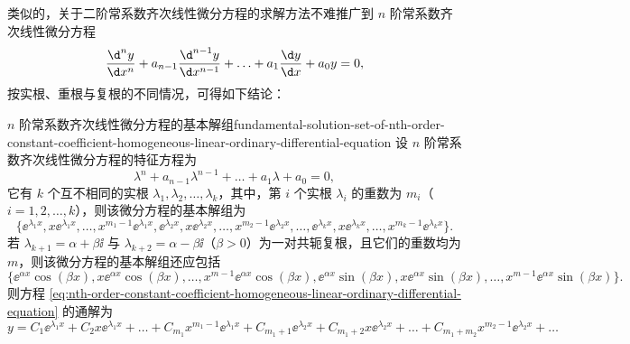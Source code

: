 \bigskip

类似的，关于二阶常系数齐次线性微分方程的求解方法不难推广到 $ n $ 阶常系数齐次线性微分方程
\begin{equation}
    \frac{\d^n y}{\d x^n} + a_{n-1} \frac{\d^{n-1} y}{\d x^{n-1}} + \ldots + a_1 \frac{\d y}{\d x} + a_0 y = 0 \label{eq:nth-order-constant-coefficient-homogeneous-linear-ordinary-differential-equation},
\end{equation}
按实根、重根与复根的不同情况，可得如下结论：
\begin{theorem}{$ n $ 阶常系数齐次线性微分方程的基本解组}{fundamental-solution-set-of-nth-order-constant-coefficient-homogeneous-linear-ordinary-differential-equation}
    设 $ n $ 阶常系数齐次线性微分方程的特征方程为
    \begin{equation*}
        \lambda^n + a_{n-1} \lambda^{n-1} + \ldots + a_1 \lambda + a_0 = 0 ,
    \end{equation*}
    它有 $ k $ 个互不相同的实根 $ \lambda_1 , \lambda_2 , \ldots , \lambda_k $，其中，第 $ i $ 个实根 $ \lambda_i $ 的重数为 $ m_i $（$ i = 1, 2, \ldots , k $），则该微分方程的基本解组为
    \begin{equation*}
        \{ \ee^{\lambda_1 x} , x \ee^{\lambda_1 x} , \ldots , x^{m_1 - 1} \ee^{\lambda_1 x} , \ee^{\lambda_2 x} , x \ee^{\lambda_2 x} , \ldots , x^{m_2 - 1} \ee^{\lambda_2 x} , \ldots , \ee^{\lambda_k x} , x \ee^{\lambda_k x} , \ldots , x^{m_k - 1} \ee^{\lambda_k x} \} .
    \end{equation*}
    若 $ \lambda_{k+1} = \alpha + \beta \ii $ 与 $ \lambda_{k+2} = \alpha - \beta \ii $（$ \beta > 0 $）为一对共轭复根，且它们的重数均为 $ m $，则该微分方程的基本解组还应包括
    \begin{equation*}
        \{ \ee^{\alpha x} \cos (\beta x) , x \ee^{\alpha x} \cos (\beta x) , \ldots , x^{m - 1} \ee^{\alpha x} \cos (\beta x) , \ee^{\alpha x} \sin (\beta x) , x \ee^{\alpha x} \sin (\beta x) , \ldots , x^{m - 1} \ee^{\alpha x} \sin (\beta x) \} .
    \end{equation*}
    则方程 \cref{eq:nth-order-constant-coefficient-homogeneous-linear-ordinary-differential-equation} 的通解为
    \begin{equation*}
        y = C_1 \ee^{\lambda_1 x} + C_2 x \ee^{\lambda_1 x} + \ldots + C_{m_1} x^{m_1 - 1} \ee^{\lambda_1 x} + C_{m_1 + 1} \ee^{\lambda_2 x} + C_{m_1 + 2} x \ee^{\lambda_2 x} + \ldots + C_{m_1 + m_2} x^{m_2 - 1} \ee^{\lambda_2 x} + \ldots
    \end{equation*}
\end{theorem}

